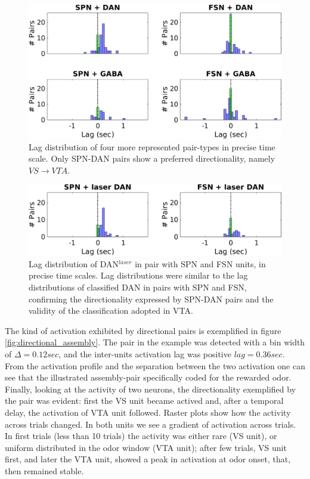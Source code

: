 \begin{figure}[H]
\centering
\includegraphics[scale=0.48]{figures/LagSec4Typo3VS.pdf}
\caption{Lag distribution of four more represented pair-types in precise time scale. Only SPN-DAN pairs show a preferred directionality, namely $VS\rightarrow VTA$.}
\label{fig:LagInSec4typo}
\end{figure}
\begin{figure}[H]
\centering
\includegraphics[scale=0.48]{figures/LagSecLaser3VS.pdf}
\caption{Lag distribution of DAN$^{laser}$ in pair with SPN and FSN units, in precise time scales. Lag distributions were similar to the lag distributions of classified DAN in pairs with SPN and FSN, confirming the directionality expressed by SPN-DAN pairs and the validity of the classification adopted in VTA.}
\label{fig:LagInSecLaser}
\end{figure}
The kind of activation exhibited by directional pairs is exemplified in figure \ref{fig:directional_assembly}. The pair in the example was detected with a bin width of $\Delta = 0.12 sec$, and the inter-units activation lag was positive $lag = 0.36 sec$. From the activation profile and the separation between the two activation one can see that the illustrated assembly-pair specifically coded for the rewarded odor.\\
Finally, looking at the activity of two neurons, the directionality exemplified by the pair was evident: first the VS unit became actived and, after a temporal delay, the activation of VTA unit followed. Raster plots show how the activity across trials changed. In both units we see a gradient of activation across trials. In first trials (less than 10 trials) the activity was either rare (VS unit), or uniform distributed in the odor window (VTA unit); after few trials, VS unit first, and later the VTA unit, showed a peak in activation at odor onset, that, then remained stable.\\ 
